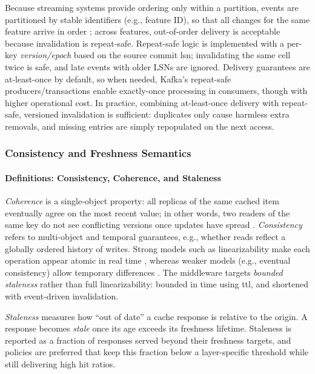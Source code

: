 Because streaming systems provide ordering only within a partition, events are partitioned by stable identifiers (e.g., feature ID), so that all changes for the same feature arrive in order \cite{Kafka_Docs}; across features, out-of-order delivery is acceptable because invalidation is repeat-safe. Repeat-safe logic is implemented with a per-key \emph{version/epoch} based on the source commit \ac{lsn}; invalidating the same cell twice is safe, and late events with older LSNs are ignored. Delivery guarantees are at-least-once by default, so when needed, Kafka's repeat-safe producers/transactions enable exactly-once processing in consumers, though with higher operational cost. In practice, combining at-least-once delivery with repeat-safe, versioned invalidation is sufficient: duplicates only cause harmless extra removals, and missing entries are simply repopulated on the next access.

\subsubsection{Consistency and Freshness Semantics}

\paragraph{Definitions: Consistency, Coherence, and Staleness}
\emph{Coherence} is a single-object property: all replicas of the same cached item eventually agree on the most recent value; in other words, two readers of the same key do not see conflicting versions once updates have spread \cite{Nagarajan_2020}. \emph{Consistency} refers to multi-object and temporal guarantees, e.g., whether reads reflect a globally ordered history of writes. Strong models such as linearizability make each operation appear atomic in real time \cite{Herlihy_1990}, whereas weaker models (e.g., eventual consistency) allow temporary differences \cite{Vogels_2009}. The middleware targets \emph{bounded staleness} rather than full linearizability: bounded in time using \ac{ttl}, and shortened with event-driven invalidation.

\emph{Staleness} measures how “out of date” a cache response is relative to the origin. A response becomes \emph{stale} once its age exceeds its freshness lifetime. Staleness is reported as a fraction of responses served beyond their freshness targets, and policies are preferred that keep this fraction below a layer-specific threshold while still delivering high hit ratios.


